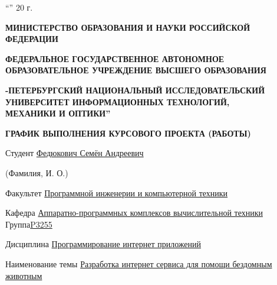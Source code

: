 \documentclass[12pt]{article}
\begin{document}
\textquotedblleft\underline{\hspace{15pt}}\textquotedblright \underline{\hspace{60pt}} 20\underline{\hspace{15pt}} г.
\newpage
\begin{center}
\bigskip\bigskip\bigskip\bigskip\bigskip\bigskip\bigskip\bigskip\bigskip\bigskip\bigskip\bigskip\bigskip\bigskip\bigskip\bigskip\bigskip\bigskip
\normalsize
\textbf{МИНИСТЕРСТВО ОБРАЗОВАНИЯ И НАУКИ РОССИЙСКОЙ ФЕДЕРАЦИИ}

\medskip 
\textbf{ФЕДЕРАЛЬНОЕ ГОСУДАРСТВЕННОЕ АВТОНОМНОЕ ОБРАЗОВАТЕЛЬНОЕ УЧРЕЖДЕНИЕ ВЫСШЕГО ОБРАЗОВАНИЯ}

\medskip 
\textbf{-ПЕТЕРБУРГСКИЙ НАЦИОНАЛЬНЫЙ ИССЛЕДОВАТЕЛЬСКИЙ }
\textbf{УНИВЕРСИТЕТ ИНФОРМАЦИОННЫХ ТЕХНОЛОГИЙ, }\\
\textbf{МЕХАНИКИ И ОПТИКИ\textquotedblright}

\bigskip\bigskip
\textbf{ГРАФИК ВЫПОЛНЕНИЯ КУРСОВОГО ПРОЕКТА (РАБОТЫ)}
\bigskip\bigskip

\end{center}

\normalsize \noindent Студент \uline{\hspace{140pt}Федюкович Семён Андреевич\hspace*{\fill}}

\hspace{8cm} \scriptsize (Фамилия, И. О.) 

\normalsize \noindent Факультет \uline{\hspace{80pt}Программной инженерии и компьютерной техники\hspace*{\fill}}

\bigskip
\normalsize \noindent Кафедра \uline{ Аппаратно-программных комплексов вычислительной техники } Группа\uline{\hspace{15pt}P3255\hspace*{\fill}}
\bigskip

\normalsize \noindent Дисциплина \uline{\hspace{90pt}Программирование интернет приложений\hspace*{\fill}}
\bigskip

\normalsize \noindent Наименование темы  \uline{\hspace{20pt}Разработка интернет сервиса для помощи бездомным животным\hspace*{\fill}}

\bigskip\bigskip
\end{document}
